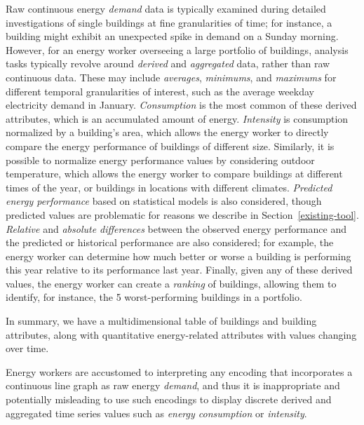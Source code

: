 \documentclass[journal]{vgtc}                %
\newcommand{\bstart}[1]{\vspace{1mm} \noindent{\textbf{#1:}}}
\newcommand{\tm}[1]{\textcolor{red}{#1}}
\begin{document}
\bstart{Derived data} Raw continuous energy {\it demand} data is typically examined during detailed investigations of single buildings at fine granularities of time; for instance, a building might exhibit an unexpected spike in demand on a Sunday morning. 
However, for an energy worker overseeing a large portfolio of buildings, analysis tasks typically revolve around {\it derived} and {\it aggregated} data, rather than raw continuous data. 
These may include {\it averages}, {\it minimums}, and {\it maximums} for different temporal granularities of interest, such as the average weekday electricity demand in January.
{\it Consumption} is the most common of these derived attributes, which is an accumulated amount of energy.
{\it Intensity} is consumption normalized by a building's area, which allows the energy worker to directly compare the energy performance of buildings of different size.
Similarly, it is possible to normalize energy performance values by considering outdoor temperature, which allows the energy worker to compare buildings at different times of the year, or buildings in locations with different climates.
{\it Predicted energy performance} based on statistical models is also considered, though predicted values are problematic for reasons we describe in Section~\ref{existing-tool}.
{\it Relative} and {\it absolute differences} between the observed energy performance and the predicted or historical performance are also considered; for example, the energy worker can determine how much better or worse a building is performing this year relative to its performance last year.
Finally, given any of these derived values, the energy worker can create a {\it ranking} of buildings, allowing them to identify, for instance, the 5 worst-performing buildings in a portfolio.

In summary, we have a multidimensional table of buildings and building attributes, along with quantitative energy-related attributes with values changing over time.

\bstart{Domain conventions} Energy workers are accustomed to interpreting any encoding that incorporates a continuous line graph as raw energy {\it demand}, and thus it is inappropriate and potentially misleading to use such encodings to display discrete derived and aggregated time series values such as {\it energy consumption} or {\it intensity}.

\end{document}
